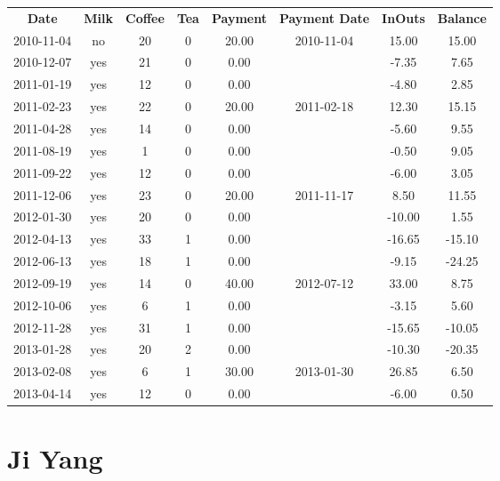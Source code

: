 \begin{center}
\begin{tabular}{cccccccc}
\textbf{Date} & \textbf{Milk} & \textbf{Coffee} & \textbf{Tea} & \textbf{Payment} & \textbf{Payment Date} & \textbf{InOuts} & \textbf{Balance} \\
2010-11-04 & no & 20 & 0 & 20.00 & 2010-11-04 &  15.00 &  15.00\\ 
2010-12-07 & yes & 21 & 0 &  0.00 &  &  -7.35 &   7.65\\ 
2011-01-19 & yes & 12 & 0 &  0.00 &  &  -4.80 &   2.85\\ 
2011-02-23 & yes & 22 & 0 & 20.00 & 2011-02-18 &  12.30 &  15.15\\ 
2011-04-28 & yes & 14 & 0 &  0.00 &  &  -5.60 &   9.55\\ 
2011-08-19 & yes &  1 & 0 &  0.00 &  &  -0.50 &   9.05\\ 
2011-09-22 & yes & 12 & 0 &  0.00 &  &  -6.00 &   3.05\\ 
2011-12-06 & yes & 23 & 0 & 20.00 & 2011-11-17 &   8.50 &  11.55\\ 
2012-01-30 & yes & 20 & 0 &  0.00 &  & -10.00 &   1.55\\ 
2012-04-13 & yes & 33 & 1 &  0.00 &  & -16.65 & -15.10\\ 
2012-06-13 & yes & 18 & 1 &  0.00 &  &  -9.15 & -24.25\\ 
2012-09-19 & yes & 14 & 0 & 40.00 & 2012-07-12 &  33.00 &   8.75\\ 
2012-10-06 & yes &  6 & 1 &  0.00 &  &  -3.15 &   5.60\\ 
2012-11-28 & yes & 31 & 1 &  0.00 &  & -15.65 & -10.05\\ 
2013-01-28 & yes & 20 & 2 &  0.00 &  & -10.30 & -20.35\\ 
2013-02-08 & yes &  6 & 1 & 30.00 & 2013-01-30 &  26.85 &   6.50\\ 
2013-04-14 & yes & 12 & 0 &  0.00 &  &  -6.00 &   0.50
\end{tabular}
\end{center}

\section{Ji Yang}

